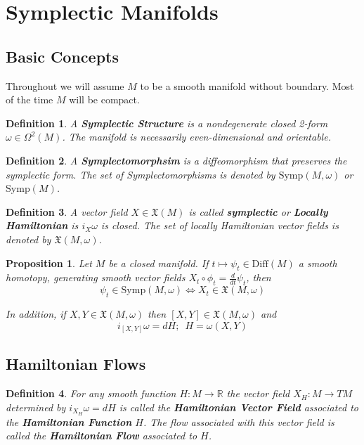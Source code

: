 \documentclass{article}
\newtheorem{defn}{Definition}
\newtheorem{prop}{Proposition}
\begin{document}
\section{Symplectic Manifolds}
\subsection{Basic Concepts}
\indent Throughout we will assume $M$ to be a smooth manifold without boundary. Most of the time $M$ will be compact. \\
\begin{defn}
A \textbf{Symplectic Structure} is a nondegenerate closed 2-form $\omega \in \Omega^2(M)$. The manifold is necessarily even-dimensional and orientable.
\end{defn}

\begin{defn}
A \textbf{Symplectomorphsim} is a diffeomorphism that preserves the symplectic form. The set of Symplectomorphisms is denoted by $\mathrm{Symp}(M,\omega)$ or $\mathrm{Symp}(M)$.
\end{defn}

\begin{defn}
A vector field $X\in \mathfrak{X}(M)$ is called \textbf{symplectic} or \textbf{Locally Hamiltonian} is $i_X\omega$ is closed. The set of locally Hamiltonian vector fields is denoted by $\mathfrak{X}(M,\omega)$.
\end{defn}

\begin{prop}
Let $M$ be a closed manifold. If $t \mapsto \psi_t \in \mathrm{Diff}(M)$ a smooth homotopy, generating smooth vector fields $X_t \circ \phi_t = \frac{d}{dt}\psi_t$, then 
\begin{equation}
    \psi_t \in \mathrm{Symp}(M,\omega) \iff X_t \in \mathfrak{X}(M,\omega)
\end{equation}

In addition, if $X,Y \in \mathfrak{X}(M,\omega)$ then $[X,Y] \in \mathfrak{X}(M,\omega)$ and 
\begin{equation}
    i_{[X,Y]}\omega = dH; \hspace{6pt} H=\omega(X,Y)
\end{equation}
\end{prop}

\subsection{Hamiltonian Flows}

\begin{defn}
For any smooth function $H:M \to \mathbb{R}$ the vector field $X_H:M \to TM$ determined by $i_{X_H}\omega=dH$ is called the \textbf{Hamiltonian Vector Field} associated to the \textbf{Hamiltonian Function} $H$. The flow associated with this vector field is called the \textbf{Hamiltonian Flow} associated to $H$.
\end{defn}
\end{document}
